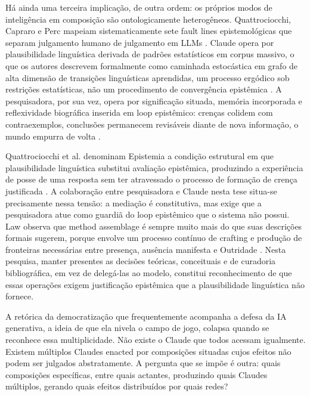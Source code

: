 Há ainda uma terceira implicação, de outra ordem: os próprios modos de inteligência em composição são ontologicamente heterogêneos. Quattrociocchi, Capraro e Perc mapeiam sistematicamente sete fault lines epistemológicas que separam julgamento humano de julgamento em LLMs \parencite{Quattrociocchi2025Epistemological}. Claude opera por plausibilidade linguística derivada de padrões estatísticos em corpus massivo, o que os autores descrevem formalmente como caminhada estocástica em grafo de alta dimensão de transições linguísticas aprendidas, um processo ergódico sob restrições estatísticas, não um procedimento de convergência epistêmica \parencite[p. 3]{Quattrociocchi2025Epistemological}. A pesquisadora, por sua vez, opera por significação situada, memória incorporada e reflexividade biográfica inserida em loop epistêmico: crenças colidem com contraexemplos, conclusões permanecem revisáveis diante de nova informação, o mundo empurra de volta \parencite[p. 4]{Quattrociocchi2025Epistemological}.

Quattrociocchi et al. denominam Epistemia a condição estrutural em que plausibilidade linguística substitui avaliação epistêmica, produzindo a experiência de posse de uma resposta sem ter atravessado o processo de formação de crença justificada \parencite[p. 8]{Quattrociocchi2025Epistemological}. A colaboração entre pesquisadora e Claude nesta tese situa-se precisamente nessa tensão: a mediação é constitutiva, mas exige que a pesquisadora atue como guardiã do loop epistêmico que o sistema não possui. Law observa que method assemblage é sempre muito mais do que suas descrições formais sugerem, porque envolve um processo contínuo de crafting e produção de fronteiras necessárias entre presença, ausência manifesta e Outridade \parencite[p. 144]{Law2004After}. Nesta pesquisa, manter presentes as decisões teóricas, conceituais e de curadoria bibliográfica, em vez de delegá-las ao modelo, constitui reconhecimento de que essas operações exigem justificação epistêmica que a plausibilidade linguística não fornece.

A retórica da democratização que frequentemente acompanha a defesa da IA generativa, a ideia de que ela nivela o campo de jogo, colapsa quando se reconhece essa multiplicidade. Não existe o Claude que todos acessam igualmente. Existem múltiplos Claudes enacted por composições situadas cujos efeitos não podem ser julgados abstratamente. A pergunta que se impõe é outra: quais composições específicas, entre quais actantes, produzindo quais Claudes múltiplos, gerando quais efeitos distribuídos por quais redes?

